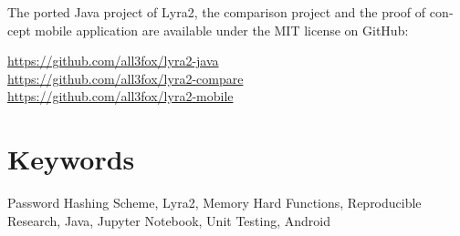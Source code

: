 \begin{otherlanguage}{english}
The ported Java project of Lyra2, the comparison project and the proof of concept mobile application are available under the MIT license on GitHub:

\url{https://github.com/all3fox/lyra2-java} \\
\url{https://github.com/all3fox/lyra2-compare} \\
\url{https://github.com/all3fox/lyra2-mobile}

\bigskip

\section*{Keywords}
Password Hashing Scheme, Lyra2, Memory Hard Functions, Reproducible Research, Java, Jupyter Notebook, Unit Testing, Android

\end{otherlanguage}
